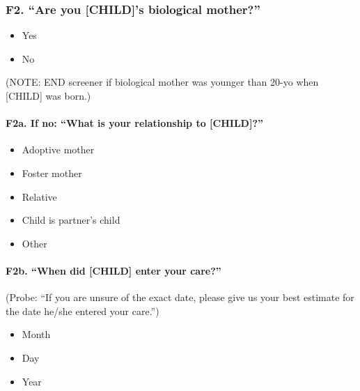 \documentclass[
  12pt,
]{book}
\providecommand{\tightlist}{%
  \setlength{\itemsep}{0pt}\setlength{\parskip}{0pt}}
\begin{document}
\hypertarget{f2.-are-you-childs-biological-mother}{%
\subsubsection*{F2. ``Are you {[}CHILD{]}'s biological mother?''}\label{f2.-are-you-childs-biological-mother}}

\begin{itemize}
\tightlist
\item
  Yes
\item
  No
\end{itemize}

(NOTE: END screener if biological mother was younger than 20-yo when {[}CHILD{]} was
born.)

\hypertarget{f2a.-if-no-what-is-your-relationship-to-child}{%
\paragraph*{F2a. If no: ``What is your relationship to {[}CHILD{]}?''}\label{f2a.-if-no-what-is-your-relationship-to-child}}

\begin{itemize}
\tightlist
\item
  Adoptive mother
\item
  Foster mother
\item
  Relative
\item
  Child is partner's child
\item
  Other
\end{itemize}

\hypertarget{f2b.-when-did-child-enter-your-care}{%
\paragraph*{F2b. ``When did {[}CHILD{]} enter your care?''}\label{f2b.-when-did-child-enter-your-care}}

(Probe: ``If you are unsure of the exact date, please give us your best
estimate for the date he/she entered your care.'')

\begin{itemize}
\tightlist
\item
  Month
\item
  Day
\item
  Year
\end{itemize}
\end{document}
